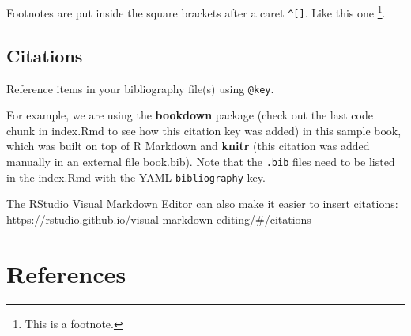 \documentclass[
]{book}
\newlength{\cslhangindent}
\newlength{\cslentryspacingunit} %
\newenvironment{CSLReferences}[2] %
 {%
  \setlength{\parindent}{0pt}
  \ifodd #1
  \let\oldpar\par
  \def\par{\hangindent=\cslhangindent\oldpar}
  \fi
  \setlength{\parskip}{#2\cslentryspacingunit}
 }%
 {}
\theoremstyle{definition}
\theoremstyle{definition}
\theoremstyle{definition}
\theoremstyle{definition}
\theoremstyle{remark}
\begin{document}
Footnotes are put inside the square brackets after a caret \texttt{\^{}{[}{]}}. Like this one \footnote{This is a footnote.}.

\hypertarget{citations}{%
\section{Citations}\label{citations}}

Reference items in your bibliography file(s) using \texttt{@key}.

For example, we are using the \textbf{bookdown} package \citep{R-bookdown} (check out the last code chunk in index.Rmd to see how this citation key was added) in this sample book, which was built on top of R Markdown and \textbf{knitr} \citep{xie2015} (this citation was added manually in an external file book.bib).
Note that the \texttt{.bib} files need to be listed in the index.Rmd with the YAML \texttt{bibliography} key.

The RStudio Visual Markdown Editor can also make it easier to insert citations: \url{https://rstudio.github.io/visual-markdown-editing/\#/citations}

\hypertarget{references}{%
\chapter{References}\label{references}}

\hypertarget{refs}{}
\begin{CSLReferences}{0}{0}
\end{CSLReferences}

  
\end{document}

